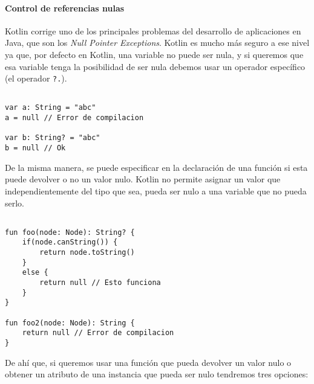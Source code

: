 \paragraph{Control de referencias nulas}

Kotlin corrige uno de los principales problemas del desarrollo de aplicaciones en Java, que son los \textit{Null Pointer Exceptions}. Kotlin es mucho más seguro a ese nivel ya que, por defecto en Kotlin, una variable no puede ser nula, y si queremos que esa variable tenga la posibilidad de ser nula debemos usar un operador específico (el operador \texttt{?.}).

\begin{verbatim}

var a: String = "abc"
a = null // Error de compilacion

var b: String? = "abc"
b = null // Ok

\end{verbatim}

De la misma manera, se puede especificar en la declaración de una función si esta puede devolver o no un valor nulo. Kotlin no permite asignar un valor que independientemente del tipo que sea, pueda ser nulo a una variable que no pueda serlo.

\begin{verbatim}

fun foo(node: Node): String? {
	if(node.canString()) {
		return node.toString()
	}
	else {
		return null // Esto funciona
	}
}

fun foo2(node: Node): String {
	return null // Error de compilacion
}

\end{verbatim}

De ahí que, si queremos usar una función que pueda devolver un valor nulo o obtener un atributo de una instancia que pueda ser nulo tendremos tres opciones:

